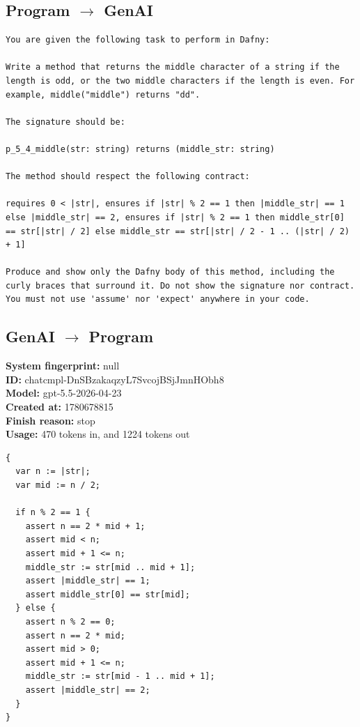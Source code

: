 \documentclass{article}
\begin{document}
\subsection*{Program $\rightarrow$ GenAI}
\begin{lstlisting}
You are given the following task to perform in Dafny:

Write a method that returns the middle character of a string if the length is odd, or the two middle characters if the length is even. For example, middle("middle") returns "dd".

The signature should be:

p_5_4_middle(str: string) returns (middle_str: string)

The method should respect the following contract:

requires 0 < |str|, ensures if |str| % 2 == 1 then |middle_str| == 1 else |middle_str| == 2, ensures if |str| % 2 == 1 then middle_str[0] == str[|str| / 2] else middle_str == str[|str| / 2 - 1 .. (|str| / 2) + 1]

Produce and show only the Dafny body of this method, including the curly braces that surround it. Do not show the signature nor contract. You must not use 'assume' nor 'expect' anywhere in your code.
\end{lstlisting}
\subsection*{GenAI $\rightarrow$ Program}
\textbf{System fingerprint: }null
\\\textbf{ID: }chatcmpl-DnSBzakaqzyL7SvcojBSjJmnHObh8
\\\textbf{Model: }gpt-5.5-2026-04-23
\\\textbf{Created at: }1780678815
\\\textbf{Finish reason: }stop
\\\textbf{Usage: }470 tokens in, and 1224 tokens out
\begin{lstlisting}
{
  var n := |str|;
  var mid := n / 2;

  if n % 2 == 1 {
    assert n == 2 * mid + 1;
    assert mid < n;
    assert mid + 1 <= n;
    middle_str := str[mid .. mid + 1];
    assert |middle_str| == 1;
    assert middle_str[0] == str[mid];
  } else {
    assert n % 2 == 0;
    assert n == 2 * mid;
    assert mid > 0;
    assert mid + 1 <= n;
    middle_str := str[mid - 1 .. mid + 1];
    assert |middle_str| == 2;
  }
}
\end{lstlisting}
\end{document}
